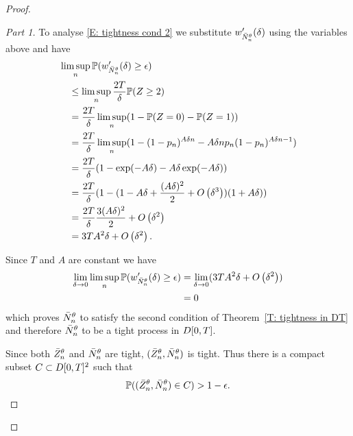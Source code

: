 \begin{proof}
\begin{proof}[Part 1]
To analyse \eqref{E: tightness cond 2} we substitute $w'_{\bar{N}_n^{\theta}}(\delta)$ using the variables above and have
\begin{equation}
\begin{aligned}
&\limsup_n \mathbb{P}(w'_{\bar{N}_n^{\theta}}(\delta) \geq \epsilon ) \\
&\quad\leq \limsup_n \frac{2T}{\delta} \mathbb{P}( Z \geq 2 ) \\
&\quad= \frac{2T}{\delta} \limsup_n (1 - \mathbb{P}( Z = 0 ) - \mathbb{P}( Z = 1 )) \\
&\quad= \frac{2T}{\delta} \limsup_n (1 - (1- p_n)^{A\delta n} - A\delta n p_n (1 - p_n)^{A\delta n - 1}) \\
&\quad= \frac{2T}{\delta} (1 - \exp(-A\delta) - A\delta\exp(-A\delta) ) \\
&\quad= \frac{2T}{\delta}(  1 - (1- A\delta + \frac{(A\delta)^2}{2} + O\left(\delta^3\right))(1 + A\delta ) ) \\
&\quad= \frac{2T}{\delta} \frac{3(A\delta)^2}{2} + O\left(\delta^2\right) \\
&\quad= 3TA^2\delta + O\left(\delta^2\right).
\end{aligned}
\end{equation}

Since $T$ and $A$ are constant we have
\begin{equation}
	\begin{aligned}
	\lim_{\delta \rightarrow 0} \limsup_n \mathbb{P}(w'_{\bar{N}_n^{\theta}}(\delta) \geq \epsilon ) 
	&= \lim_{\delta \rightarrow 0} ( 3TA^2\delta + O\left(\delta^2\right) )\\
	&= 0
	\end{aligned}
\end{equation}
which proves $\bar{N}_n^{\theta}$ to satisfy the second condition of Theorem~\ref{T: tightness in DT}
and therefore $\bar{N}_n^{\theta}$ to be a tight process in $D[0, T]$.

Since both $\bar{Z}^{\theta}_n$ and $\bar{N}_n^{\theta}$ are tight, $(\bar{Z}^{\theta}_n, \bar{N}_n^{\theta})$ is tight.
Thus there is a compact subset $C \subset D[0, T]^2$ such that
\begin{equation}
	\mathbb{P}( (\bar{Z}^{\theta}_n, \bar{N}_n^{\theta}) \in C) > 1 - \epsilon.
\end{equation}
\end{proof}




\end{proof}
